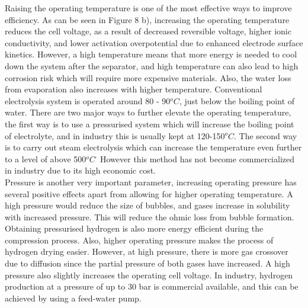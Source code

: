 Raising the operating temperature is one of the most effective ways to improve efficiency. As can be seen in Figure 8 b), increasing the operating temperature reduces the cell voltage, as a result of decreased reversible voltage, higher ionic conductivity, and lower activation overpotential due to enhanced electrode surface kinetics. However, a high temperature means that more energy is needed to cool down the system after the separator, and high temperature can also lead to high corrosion risk which will require more expensive materials. Also, the water loss from evaporation also increases with higher temperature. Conventional electrolysis system is operated around 80 - 90$^oC$, just below the boiling point of water. There are two major ways to further elevate the operating temperature, the first way is to use a pressurised system which will increase the boiling point of electrolyte, and in industry this is usually kept at 120-150$^oC$. The second way is to carry out steam electrolysis which can increase the temperature even further to a level of above 500$^oC^.$ However this method has not become commercialized in industry due to its high economic cost.\cite{temp} \cite{reversible} \\
Pressure is another very important parameter, increasing operating pressure has several positive effects apart from allowing for higher operating temperature.  A high pressure would reduce the size of bubbles, and gases increase in solubility with increased pressure. This will reduce the ohmic loss from bubble formation. Obtaining pressurised hydrogen is also more energy efficient during the compression process. Also, higher operating pressure makes the process of hydrogen drying easier. However, at high pressure, there is more gas crossover due to diffusion since the partial pressure of both gases have increased. A high pressure also slightly increases the operating cell voltage. \cite{pressure} In industry, 
hydrogen production at a pressure of up to 30 bar is  commercial available, and this can be achieved by using a feed-water pump.\cite{pressure2} 


